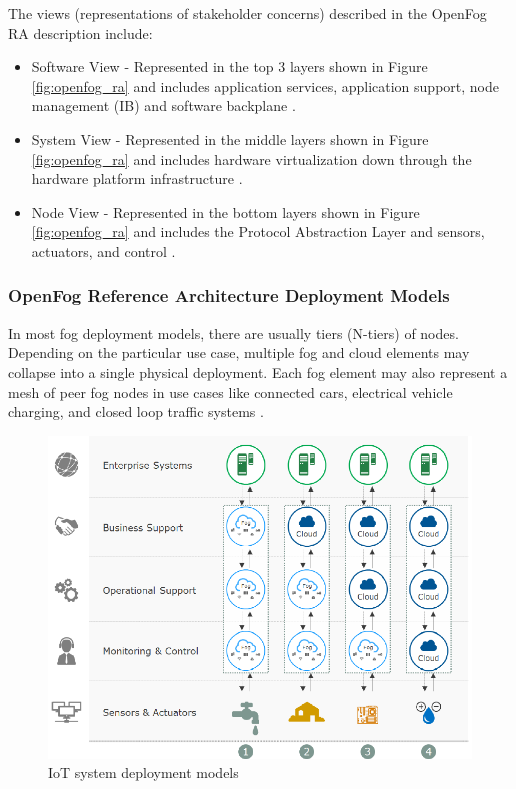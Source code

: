 \documentclass{article}
\begin{document}
The views (representations of stakeholder concerns) \cite{openfogconsortium2017} described in the OpenFog RA description include:

\begin{itemize}
\item Software View - Represented in the top 3 layers shown in Figure \ref{fig:openfog_ra} and includes application services, application support, node management (IB) and software backplane \cite{openfogconsortium2017}.

\item System View - Represented in the middle layers shown in Figure \ref{fig:openfog_ra} and includes hardware virtualization down through the hardware platform infrastructure \cite{openfogconsortium2017}.

\item Node View - Represented in the bottom layers shown in Figure \ref{fig:openfog_ra} and includes the Protocol Abstraction Layer and sensors, actuators, and control \cite{openfogconsortium2017}.
\end{itemize} 

\subsubsection{OpenFog Reference Architecture Deployment Models} 

In most fog deployment models, there are usually tiers (N-tiers) of nodes. Depending on the particular use case, multiple fog and cloud elements may collapse into a single physical deployment. Each fog element may also represent a mesh of peer fog nodes in use cases like connected cars, electrical vehicle charging, and closed loop traffic systems \cite{openfogconsortium2017}.

\begin{figure}[H]
	\centering
	\includegraphics[scale=0.5]{models.png}
	\caption{IoT system deployment models \cite{openfogconsortium2017}}
	\label{fig:depl_models}
\end{figure}
\end{document}
